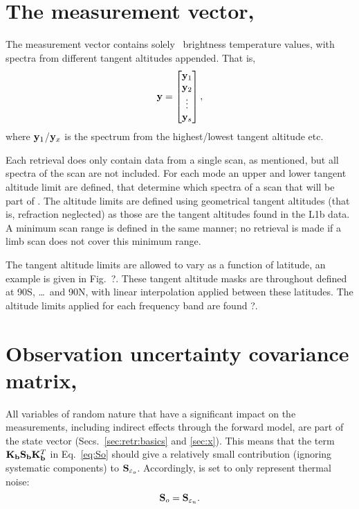 \section{The measurement vector, \MsrVct}
\label{sec:y}
%
The measurement vector contains solely \smr\ brightness temperature values,
with spectra from different tangent altitudes appended. That is,
\begin{equation}
  \label{eq:y}
  \mathbf{y} =
  \begin{bmatrix}
    \mathbf{y}_1\\ 
    \mathbf{y}_2\\ 
    \vdots\\ 
    \mathbf{y}_s
  \end{bmatrix},
\end{equation}
where $\mathbf{y}_1$/$\mathbf{y}_x$ is the spectrum from the highest/lowest tangent
altitude etc. 

Each retrieval does only contain data from a single scan, as mentioned, but all
spectra of the scan are not included. For each mode an upper and lower tangent
altitude limit are defined, that determine which spectra of a scan that will be
part of \MsrVct. The altitude limits are defined using geometrical tangent
altitudes (that is, refraction neglected) as those are the tangent altitudes
found in the L1b data. A minimum scan range is defined in the same manner; no
retrieval is made if a limb scan does not cover this minimum range.

The tangent altitude limits are allowed to vary as a function of latitude, an
example is given in Fig.~?. These tangent altitude masks are
throughout defined at 90\degree S, \dots{}\ and 90\degree N,
with linear interpolation applied between these latitudes. The altitude limits
applied for each frequency band are found ?.



\section{Observation uncertainty covariance matrix, }
\label{sec:So}
%
All variables of random nature that have a significant impact on the
measurements, including indirect effects through the forward model, are part of
the state vector (Secs.~\ref{sec:retr:basics} and \ref{sec:x}). This means that
the term $\mathbf{K}_{\mathbf{b}}\mathbf{S}_{\mathbf{b}} \mathbf{K}_{\mathbf{b}}^T$ in
Eq.~\ref{eq:So} should give a relatively small contribution (ignoring
systematic components) to $\mathbf{S}_{\varepsilon_o}$. Accordingly,  is
set to only represent thermal noise:
\begin{equation}
  \mathbf{S}_{o} = \mathbf{S}_{\varepsilon_n}.
\end{equation}
\\


